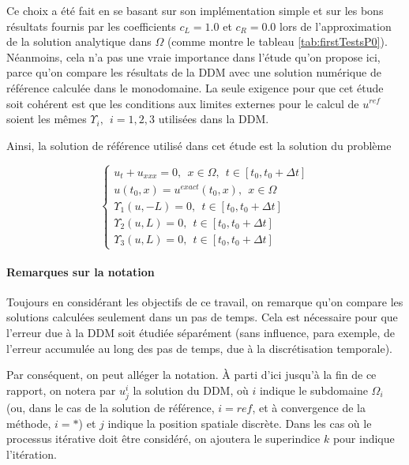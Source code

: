 \indent Ce choix a été fait en se basant sur son implémentation simple et sur les bons résultats fournis par les coefficients $c_L = 1.0$ et $c_R = 0.0$ lors de l'approximation de la solution analytique dans $\Omega$ (comme montre le tableau \ref{tab:firstTestsP0}). Néanmoins, cela n'a pas une vraie importance dans l'étude qu'on propose ici, parce qu'on compare les résultats de la DDM avec une solution numérique de référence calculée  dans le monodomaine. La seule exigence pour que cet étude soit cohérent est que les conditions aux limites externes pour le calcul de $u^{ref}$ soient les mêmes $\Upsilon_i, \ \ i=1,2,3$ utilisées dans la DDM.

\indent Ainsi, la solution de référence utilisé dans cet étude est la solution du problème

\begin{equation}
	\label{eq:problemMonodomain}
	\begin{cases}
	u_t + u_{xxx} = 0, \ \ x \in \Omega, \ \ t \in [t_0, t_0+\Delta t] \\
	u(t_0,x) = u^{exact}(t_0,x) , \ \ x \in \Omega \\ 
	\Upsilon_1(u,-L) = 0, \ \ t \in [t_0, t_0+\Delta t] \\
	\Upsilon_2(u,L) = 0, \ \ t \in [t_0, t_0+\Delta t] \\
	\Upsilon_3(u,L) = 0, \ \ t \in [t_0, t_0+\Delta t]
	\end{cases}
\end{equation}


\paragraph{Remarques sur la notation}

\indent Toujours en considérant les objectifs de ce travail, on remarque qu'on compare les solutions calculées seulement dans un pas de temps. Cela est nécessaire pour que l'erreur due à la DDM soit étudiée séparément (sans influence, para exemple, de l'erreur accumulée au long des pas de temps, due à la discrétisation temporale).

\indent Par conséquent, on peut alléger la notation. À parti d'ici jusqu'à la fin de ce rapport, on notera par $u_j^i$ la solution du DDM, où $i$ indique le subdomaine $\Omega_i$ (ou, dans le cas de la solution de référence, $i=ref$, et à convergence de la méthode, $i=*$) et $j$ indique la position spatiale discrète. Dans les cas où le processus itérative doit être considéré, on ajoutera le superindice $k$ pour indique l'itération.

